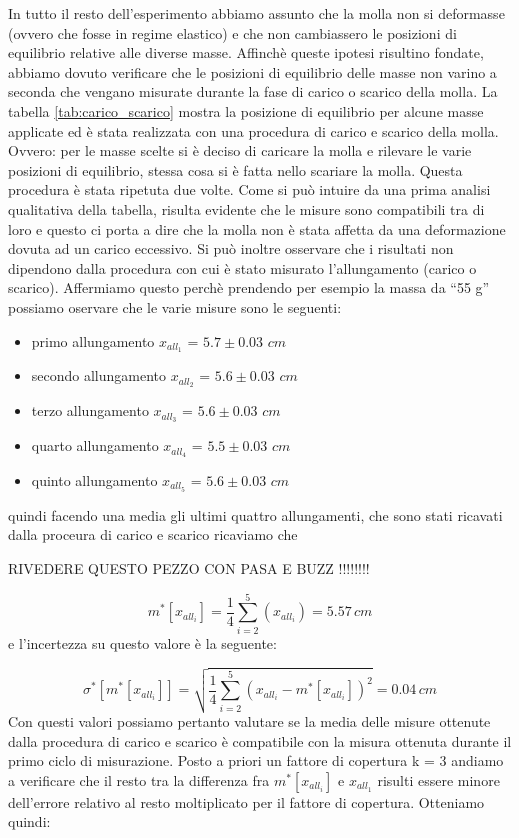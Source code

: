 In tutto il resto dell'esperimento abbiamo assunto che la molla non si deformasse (ovvero che fosse in regime elastico)
e che non cambiassero le posizioni di equilibrio relative alle diverse masse. Affinchè queste ipotesi risultino fondate,
abbiamo dovuto verificare che le posizioni di equilibrio delle masse non varino a seconda che vengano misurate durante la fase di carico
o scarico della molla. La tabella \ref{tab:carico_scarico} mostra la posizione di equilibrio per alcune masse applicate ed è stata realizzata con una procedura di carico e scarico della molla. Ovvero: per le masse scelte si è deciso di caricare la molla e rilevare le varie posizioni di equilibrio, stessa cosa si è fatta nello scariare la molla. Questa procedura è stata ripetuta due volte.
Come si può intuire da una prima analisi qualitativa della tabella, risulta evidente che le misure sono compatibili tra di loro e questo ci porta a dire che la molla non è stata affetta da una deformazione dovuta ad un carico eccessivo. Si può inoltre osservare che i risultati non dipendono dalla procedura con cui è stato misurato l'allungamento (carico o scarico).
Affermiamo questo perchè prendendo per esempio la massa da ``55 g'' possiamo oservare che le varie misure sono le seguenti:
\begin{itemize}
	\item{primo allungamento $x_{all_1}$ = $5.7 \pm 0.03 \,\,cm$}
	\item{secondo allungamento $x_{all_2}$ = $5.6 \pm 0.03 \,\,cm$}
	\item{terzo allungamento $x_{all_3}$ = $5.6 \pm 0.03 \,\,cm$}
	\item{quarto allungamento $x_{all_4}$ = $5.5 \pm 0.03 \,\,cm$}
	\item{quinto allungamento $x_{all_5}$ = $5.6 \pm 0.03 \,\,cm$}
\end{itemize}
quindi facendo una media gli ultimi quattro allungamenti, che sono stati ricavati dalla proceura di carico e scarico ricaviamo che

RIVEDERE QUESTO PEZZO CON PASA E BUZZ !!!!!!!!

\begin{equation*}
	m^*[x_{all_i}] = \frac{1}{4} \sum_{i=2}^{5} (x_{all_i}) = 5.57\, cm
\end{equation*}
%
e l'incertezza su questo valore è la seguente:

\begin{equation*}
	\sigma^*[m^*[x_{all_i}]] = \sqrt{\frac{1}{4} \sum_{i=2}^{5} (x_{all_i} - m^*[x_{all_i}])^2} = 0.04 \,cm
\end{equation*}
%
Con questi valori possiamo pertanto valutare se la media delle misure ottenute dalla procedura di carico e scarico è compatibile con la misura ottenuta durante il primo ciclo di misurazione. Posto a priori un fattore di copertura k = 3 andiamo a verificare che il resto tra la differenza fra $m^*[x_{all_i}]$ e $x_{all_1}$ risulti essere minore dell'errore relativo al resto moltiplicato per il fattore di copertura.
Otteniamo quindi:

